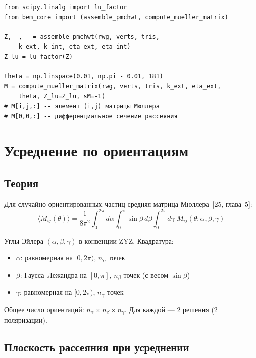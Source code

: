 \documentclass[12pt,a4paper]{article}
\begin{document}
\begin{lstlisting}
from scipy.linalg import lu_factor
from bem_core import (assemble_pmchwt, compute_mueller_matrix)

Z, _, _ = assemble_pmchwt(rwg, verts, tris,
    k_ext, k_int, eta_ext, eta_int)
Z_lu = lu_factor(Z)

theta = np.linspace(0.01, np.pi - 0.01, 181)
M = compute_mueller_matrix(rwg, verts, tris, k_ext, eta_ext,
    theta, Z_lu=Z_lu, sM=-1)
# M[i,j,:] -- элемент (i,j) матрицы Мюллера
# M[0,0,:] -- дифференциальное сечение рассеяния
\end{lstlisting}


\section{Усреднение по ориентациям}

\subsection{Теория}

Для случайно ориентированных частиц средняя матрица Мюллера~[25, глава~5]:
\begin{equation}
  \langle M_{ij}(\theta) \rangle = \frac{1}{8\pi^2} \int_0^{2\pi}\!d\alpha \int_0^{\pi}\!\sin\beta\,d\beta \int_0^{2\pi}\!d\gamma \; M_{ij}(\theta; \alpha,\beta,\gamma)
\end{equation}

Углы Эйлера $(\alpha, \beta, \gamma)$ в конвенции ZYZ. Квадратура:
\begin{itemize}
  \item $\alpha$: равномерная на $[0, 2\pi)$, $n_\alpha$ точек
  \item $\beta$: Гаусса--Лежандра на $[0, \pi]$, $n_\beta$ точек (с весом $\sin\beta$)
  \item $\gamma$: равномерная на $[0, 2\pi)$, $n_\gamma$ точек
\end{itemize}

Общее число ориентаций: $n_\alpha \times n_\beta \times n_\gamma$. Для каждой --- 2 решения (2 поляризации).

\subsection{Плоскость рассеяния при усреднении}
\label{sec:scat_plane_avg}
\end{document}
